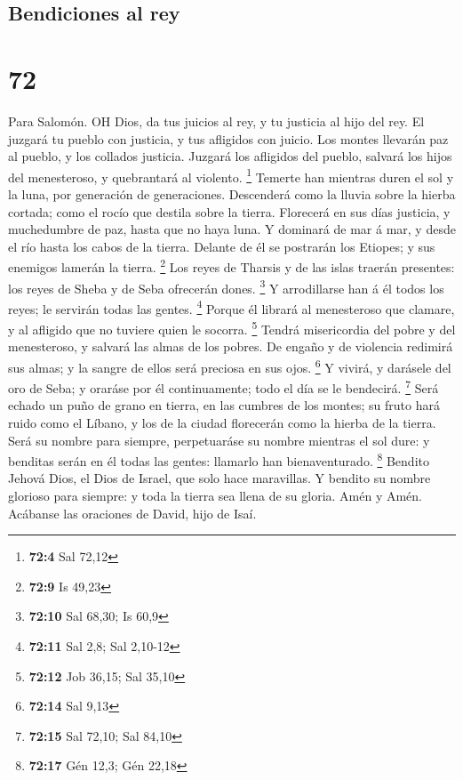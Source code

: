 \hypertarget{bendiciones-al-rey}{%
\subsection{Bendiciones al rey}\label{bendiciones-al-rey}}

\hypertarget{section-71}{%
\section{72}\label{section-71}}

 Para Salomón. OH Dios, da tus juicios al rey, y tu justicia
al hijo del rey.  El juzgará tu pueblo con justicia, y tus
afligidos con juicio.  Los montes llevarán paz al pueblo, y
los collados justicia.  Juzgará los afligidos del pueblo,
salvará los hijos del menesteroso, y quebrantará al violento.
\footnote{\textbf{72:4} Sal 72,12}  Temerte han mientras
duren el sol y la luna, por generación de generaciones. 
Descenderá como la lluvia sobre la hierba cortada; como el rocío que
destila sobre la tierra.  Florecerá en sus días justicia, y
muchedumbre de paz, hasta que no haya luna.  Y dominará de
mar á mar, y desde el río hasta los cabos de la tierra. 
Delante de él se postrarán los Etiopes; y sus enemigos lamerán la
tierra. \footnote{\textbf{72:9} Is 49,23}  Los reyes de
Tharsis y de las islas traerán presentes: los reyes de Sheba y de Seba
ofrecerán dones. \footnote{\textbf{72:10} Sal 68,30; Is 60,9}
 Y arrodillarse han á él todos los reyes; le servirán todas
las gentes. \footnote{\textbf{72:11} Sal 2,8; Sal 2,10-12} 
Porque él librará al menesteroso que clamare, y al afligido que no
tuviere quien le socorra. \footnote{\textbf{72:12} Job 36,15; Sal 35,10}
 Tendrá misericordia del pobre y del menesteroso, y salvará
las almas de los pobres.  De engaño y de violencia redimirá
sus almas; y la sangre de ellos será preciosa en sus ojos. \footnote{\textbf{72:14}
  Sal 9,13}  Y vivirá, y darásele del oro de Seba; y
oraráse por él continuamente; todo el día se le bendecirá. \footnote{\textbf{72:15}
  Sal 72,10; Sal 84,10}  Será echado un puño de grano en
tierra, en las cumbres de los montes; su fruto hará ruido como el
Líbano, y los de la ciudad florecerán como la hierba de la tierra.
 Será su nombre para siempre, perpetuaráse su nombre
mientras el sol dure: y benditas serán en él todas las gentes: llamarlo
han bienaventurado. \footnote{\textbf{72:17} Gén 12,3; Gén 22,18}
 Bendito Jehová Dios, el Dios de Israel, que solo hace
maravillas.  Y bendito su nombre glorioso para siempre: y
toda la tierra sea llena de su gloria. Amén y Amén. 
Acábanse las oraciones de David, hijo de Isaí.

